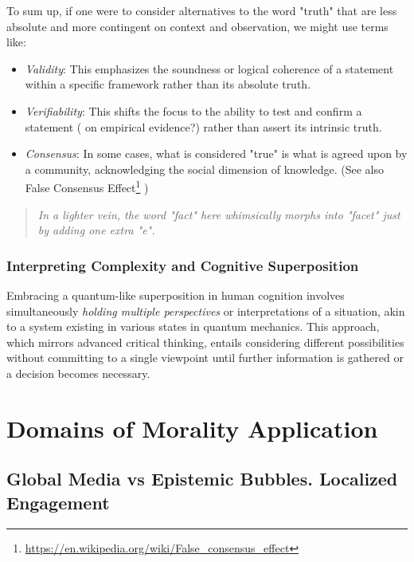 \documentclass[11pt,a4]{article}
\begin{document}
    To sum up, if one were to consider alternatives to the word "truth" that are less absolute and more contingent on context and observation, we might use terms like:

    \begin{itemize}
        \item \textit{Validity}: This emphasizes the soundness or logical coherence of a statement within a specific framework rather than its absolute truth.
        \item \textit{Verifiability}: This shifts the focus to the ability to test and confirm a statement ( on empirical evidence?) rather than assert its intrinsic truth.
        \item \textit{Consensus}: In some cases, what is considered "true" is what is agreed upon by a community, acknowledging the social dimension of knowledge.
        (See also False Consensus Effect\footnote{\url{https://en.wikipedia.org/wiki/False_consensus_effect} } )

    \end{itemize}

    \begin{quote}
        \textit{In a lighter vein, the word "fact" here whimsically morphs into "facet" just by adding one extra "e".
    }
    \end{quote}



        \subsubsection{Interpreting Complexity and Cognitive Superposition}

        Embracing a quantum-like superposition in human cognition involves
        simultaneously \textit{holding multiple perspectives} or interpretations of a situation, akin to a
        system existing in various states in quantum mechanics. This approach, which mirrors advanced
        critical thinking, entails considering different possibilities without committing to a single
        viewpoint until further information is gathered or a decision becomes necessary.



\section{Domains of Morality Application  }
    \subsection{Global Media vs Epistemic Bubbles. Localized Engagement}
\end{document}
